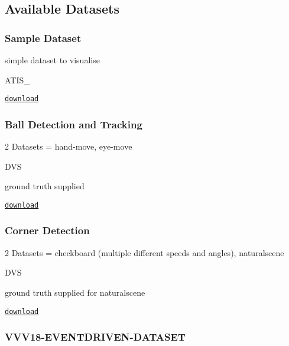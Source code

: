 \subsection*{Available Datasets}

\subsubsection*{Sample Dataset}


\begin{DoxyItemize}
\item simple dataset to visualise
\item A\+T\+I\+S\+\_
\end{DoxyItemize}

\href{https://doi.org/10.5281/zenodo.2556755}{\tt download}

\subsubsection*{Ball Detection and Tracking}


\begin{DoxyItemize}
\item 2 Datasets = hand-\/move, eye-\/move
\item D\+VS
\item ground truth supplied
\end{DoxyItemize}

\href{https://figshare.com/s/0abd8f18312bec15b121}{\tt download}

\subsubsection*{Corner Detection}


\begin{DoxyItemize}
\item 2 Datasets = checkboard (multiple different speeds and angles), naturalscene
\item D\+VS
\item ground truth supplied for naturalscene
\end{DoxyItemize}

\href{https://figshare.com/s/0abd8f18312bec15b121}{\tt download}

\subsubsection*{V\+V\+V18-\/\+E\+V\+E\+N\+T\+D\+R\+I\+V\+E\+N-\/\+D\+A\+T\+A\+S\+ET}


